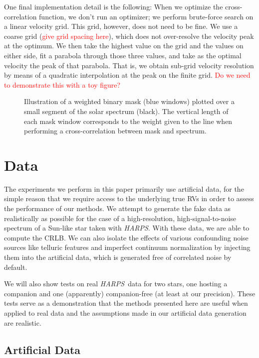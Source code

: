 \documentclass[modern]{aastex61}
\newcommand{\todo}[1]{\textcolor{red}{#1}}  %
\newcommand{\acronym}[1]{{\small{#1}}}
\newcommand{\project}[1]{\textsl{#1}}
\newcommand{\HARPS}{\project{\acronym{HARPS}}}
\newcommand{\CRLB}{\acronym{CRLB}}
\begin{document}
One final implementation detail is the following:
When we optimize the cross-correlation function, we don't run an optimizer;
we perform brute-force search on a linear velocity grid.
This grid, however, does not need to be fine.
We use a coarse grid (\todo{give grid spacing here}), which does not
over-resolve the velocity peak at the optimum.
We then take the highest value on the grid and the values on either
side, fit a parabola through those three values, and take as the optimal
velocity the peak of that parabola.
That is, we obtain sub-grid velocity resolution by means of a quadratic
interpolation at the peak on the finite grid.
\todo{Do we need to demonstrate this with a toy figure?}

\begin{figure}
\centering
\caption{Illustration of a weighted binary mask (blue windows) plotted over a small segment of the solar spectrum (black). The vertical length of each mask window corresponds to the weight given to the line when performing a cross-correlation between mask and spectrum.}
\label{fig:binarymask}
\end{figure}

\section{Data}
\label{s:data}

The experiments we perform in this paper primarily use artificial data, for the simple reason that we require access to the underlying true RVs in order to assess the performance of our methods. 
We attempt to generate the fake data as realistically as possible for the case of a high-resolution, high-signal-to-noise spectrum of a Sun-like star taken with \HARPS. 
With these data, we are able to compute the \CRLB.  
We can also isolate the effects of various confounding noise sources like telluric features and imperfect continuum normalization by injecting them into the artificial data, which is generated free of correlated noise by default.

We will also show tests on real \HARPS\ data for two stars, one hosting a companion and
one (apparently) companion-free (at least at our precision). 
These tests serve as a demonstration that the methods presented here are useful when applied to real data and the assumptions made in our artificial data generation are realistic.

\subsection{Artificial Data}
\end{document}

